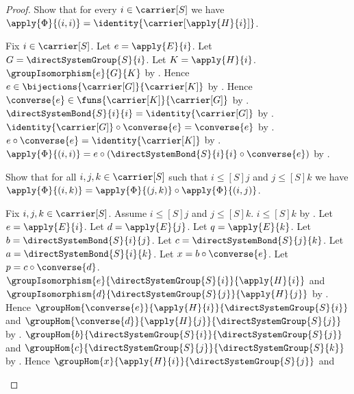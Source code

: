 \begin{proof}
    Show that for every $i\in\carrier[S]$ we have
        $\apply{\Phi}{(i,i)}=\identity{\carrier[\apply{H}{i}]}$.
    \begin{subproof}
        Fix $i\in\carrier[S]$.
        Let $e=\apply{E}{i}$.
        Let $G=\directSystemGroup{S}{i}$.
        Let $K=\apply{H}{i}$.
        $\groupIsomorphism{e}{G}{K}$ by \auto.
        Hence $e\in\bijections{\carrier[G]}{\carrier[K]}$ by
            .
        Hence $\converse{e}\in\funs{\carrier[K]}{\carrier[G]}$ by
            .
        $\directSystemBond{S}{i}{i}=\identity{\carrier[G]}$ by
            .
        $\identity{\carrier[G]}\circ\converse{e}=\converse{e}$ by
            .
        $e\circ\converse{e}=\identity{\carrier[K]}$ by
            .
        $\apply{\Phi}{(i,i)}=
            e\circ(\directSystemBond{S}{i}{i}\circ\converse{e})$ by
            .
    \end{subproof}
    Show that for all $i,j,k\in\carrier[S]$ such that
        $i\mathrel{\leq[S]}j$ and $j\mathrel{\leq[S]}k$ we have
        $\apply{\Phi}{(i,k)}=
            \apply{\Phi}{(j,k)}\circ\apply{\Phi}{(i,j)}$.
    \begin{subproof}
        Fix $i,j,k\in\carrier[S]$.
        Assume $i\mathrel{\leq[S]}j$ and
            $j\mathrel{\leq[S]}k$.
        $i\mathrel{\leq[S]}k$ by
            .
        Let $e=\apply{E}{i}$.
        Let $d=\apply{E}{j}$.
        Let $q=\apply{E}{k}$.
        Let $b=\directSystemBond{S}{i}{j}$.
        Let $c=\directSystemBond{S}{j}{k}$.
        Let $a=\directSystemBond{S}{i}{k}$.
        Let $x=b\circ\converse{e}$.
        Let $p=c\circ\converse{d}$.
        $\groupIsomorphism{e}
            {\directSystemGroup{S}{i}}{\apply{H}{i}}$ and
            $\groupIsomorphism{d}
            {\directSystemGroup{S}{j}}{\apply{H}{j}}$ by \auto.
        Hence $\groupHom{\converse{e}}
            {\apply{H}{i}}{\directSystemGroup{S}{i}}$ and
            $\groupHom{\converse{d}}
            {\apply{H}{j}}{\directSystemGroup{S}{j}}$ by
            .
        $\groupHom{b}{\directSystemGroup{S}{i}}
            {\directSystemGroup{S}{j}}$ and
            $\groupHom{c}{\directSystemGroup{S}{j}}
            {\directSystemGroup{S}{k}}$ by
            .
        Hence $\groupHom{x}{\apply{H}{i}}
            {\directSystemGroup{S}{j}}$ and

\end{subproof}
\end{proof}
